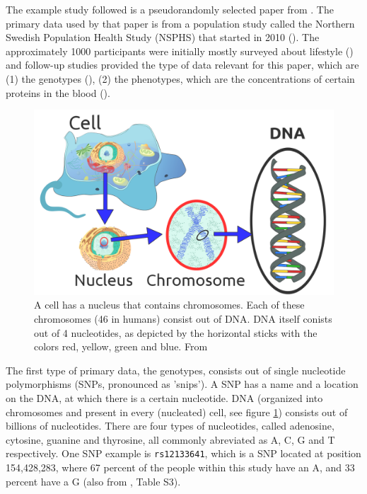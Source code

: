 The example study followed is a pseudorandomly selected paper
from \cite{ahsan2017relative}. The primary data used by that paper is
from a population study called the Northern Swedish Population
Health Study (NSPHS) that started in 2010 (\cite{igl2010northern}). 
The approximately 1000 participants were initially mostly surveyed
about lifestyle (\cite{igl2010northern}) and follow-up studies
provided the type of data relevant for this paper, 
which are (1) the genotypes (\cite{johansson2013identification}),
(2) the phenotypes, which are the concentrations of certain proteins
in the blood (\cite{enroth2014strong,enroth2015effect}).

\begin{figure}[!htbp]
  \centering
  \includegraphics[width=\linewidth]{1189px-Eukaryote_DNA-en.png}
  \caption{
    A cell has a nucleus that contains chromosomes. 
    Each of these chromosomes (46 in humans) consist out of DNA. 
    DNA itself conists out of 4 nucleotides, 
    as depicted by the horizontal sticks 
    with the colors red, yellow, green and blue.
    From \cite{sponk2012}
  }
  \label{fig:eukakyote_dna}
\end{figure}

The first type of primary data, the genotypes, 
consists out of single nucleotide polymorphisms (SNPs, pronounced as 'snips').
A SNP has a name and a location on the DNA, at which there is a certain nucleotide.
DNA (organized into chromosomes and present in every (nucleated) cell, 
see figure \ref{fig:eukakyote_dna}) 
consists out of billions of nucleotides.
There are four types of nucleotides, 
called adenosine, cytosine, guanine and thyrosine, all commonly abreviated
as A, C, G and T respectively.
One SNP example is \verb|rs12133641|, which is a SNP located at position 
154,428,283, where 67 percent of the people within this study have an A,
and 33 percent have a G (also from \cite{ahsan2017relative}, Table S3).

